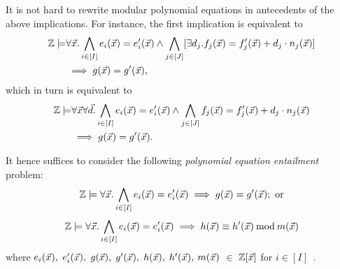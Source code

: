 It is not hard to rewrite modular polynomial equations in antecedents
of the above implications. For instance, the first implication is
equivalent to
\begin{equation*}
\begin{aligned}
\bbfZ \models & \forall \vx. %
\bigwedge\limits_{i \in [I]} e_i (\vx) = e'_i (\vx) \wedge
\bigwedge\limits_{j \in [J]} [\exists d_j. f_j (\vx) = f'_j (\vx) + d_j \cdot n_j (\vx)] \\
& \implies
g (\vx) = g' (\vx),
\end{aligned}
\end{equation*}
which in turn is equivalent to
\begin{equation*}
\begin{aligned}
\bbfZ \models & \forall \vx \forall \vd. %
\bigwedge\limits_{i \in [I]} e_i (\vx) = e'_i (\vx) \wedge
\bigwedge\limits_{j \in [J]} f_j (\vx) = f'_j (\vx) + d_j \cdot n_j (\vx) \\
& \implies
g (\vx) = g' (\vx).
\end{aligned}
\end{equation*}

It hence suffices to consider the following
\emph{polynomial equation entailment} problem:
\begin{equation}
  \label{eq:reduced-polynomial-equation-implicant}
  \bbfZ \models \forall \vx. %
  \bigwedge\limits_{i \in [I]} e_i (\vx) = e'_i (\vx)
  \implies
  g (\vx) = g' (\vx); \textmd{ or}
\end{equation}
\begin{equation}
   \label{eq:reduced-modular-polynomial-equation-implicant}
   \bbfZ \models \forall \vx. %
   \bigwedge\limits_{i \in [I]} e_i (\vx) = e'_i (\vx)
   \implies
   h (\vx) \equiv h' (\vx) \mod m (\vx)
\end{equation}
 where $e_i (\vec{x}),$ $e'_i (\vec{x}),$ $g (\vec{x}),$ $g' (\vec{x}),$ $h (\vec{x}),$ $h' (\vec{x}),$ $m (\vec{x})$
 $\in$ $\mathbb{Z}[\vec{x}]$ for $i \in [I]$~\cite{H:07:AENTP}.

